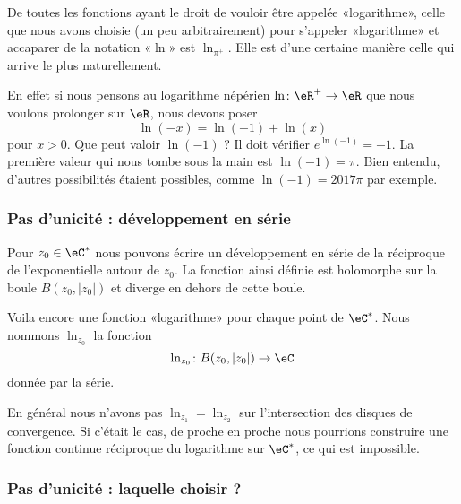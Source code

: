 De toutes les fonctions ayant le droit de vouloir être appelée «logarithme», celle que nous avons choisie (un peu arbitrairement) pour s'appeler «logarithme» et accaparer de la notation «\( \ln\)» est \( \ln_{\pi^+}\). Elle est d'une certaine manière celle qui arrive le plus naturellement.

En effet si nous pensons au logarithme népérien \( \ln\colon \eR^+\to \eR\) que nous voulons prolonger sur \( \eR\), nous devons poser
\begin{equation}
    \ln(-x)=\ln(-1)+\ln(x)
\end{equation}
pour \( x>0\). Que peut valoir \( \ln(-1)\) ? Il doit vérifier \(  e^{\ln(-1)}=-1\). La première valeur qui nous tombe sous la main est \( \ln(-1)=\pi\). Bien entendu, d'autres possibilités étaient possibles, comme \( \ln(-1)=2017\pi\) par exemple.

\subsubsection{Pas d'unicité : développement en série}

Pour \( z_0\in \eC^*\) nous pouvons écrire un développement en série de la réciproque de l'exponentielle autour de \( z_0\). La fonction ainsi définie est holomorphe sur la boule \( B(z_0,| z_0 |)\) et diverge en dehors de cette boule.

Voila encore une fonction «logarithme» pour chaque point de \( \eC^*\). Nous nommons \( \ln_{z_0}\) la fonction
\begin{equation}
    \ln_{z_0}\colon B(z_0,| z_0 |)\to \eC
\end{equation}
donnée par la série.

En général nous n'avons pas \( \ln_{z_1}=\ln_{z_2}\) sur l'intersection des disques de convergence. Si c'était le cas, de proche en proche nous pourrions construire une fonction continue réciproque du logarithme sur \( \eC^*\), ce qui est impossible.

\subsubsection{Pas d'unicité : laquelle choisir ?}

